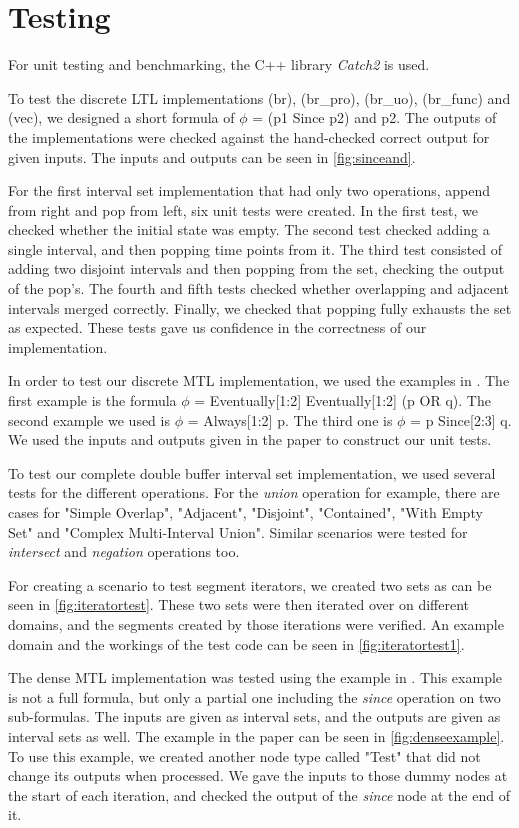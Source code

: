 \documentclass[a4paper,12pt]{report}
\begin{document}
\section{Testing}

For unit testing and benchmarking, the C++ library \textit{Catch2} is used.

To test the discrete LTL implementations (br), (br\_pro), (br\_uo), (br\_func) and (vec), we designed a short formula of $\phi$ = (p1 Since p2) and p2. The outputs of the implementations were checked against the hand-checked correct output for given inputs. The inputs and outputs can be seen in \ref{fig:sinceand}.

For the first interval set implementation that had only two operations, append from right and pop from left, six unit tests were created. In the first test, we checked whether the initial state was empty. The second test checked adding a single interval, and then popping time points from it. The third test consisted of adding two disjoint intervals and then popping from the set, checking the output of the pop's. The fourth and fifth tests checked whether overlapping and adjacent intervals merged correctly. Finally, we checked that popping fully exhausts the set as expected. These tests gave us confidence in the correctness of our implementation.

In order to test our discrete MTL implementation, we used the examples in \cite{Ulus19}. The first example is the formula $\phi$ = Eventually[1:2] Eventually[1:2] (p OR q). The second example we used is $\phi$ = Always[1:2] p. The third one is $\phi$ = p Since[2:3] q. We used the inputs and outputs given in the paper to construct our unit tests.

To test our complete double buffer interval set implementation, we used several tests for the different operations. For the \textit{union} operation for example, there are cases for "Simple Overlap", "Adjacent", "Disjoint", "Contained", "With Empty Set" and "Complex Multi-Interval Union". Similar scenarios were tested for \textit{intersect} and \textit{negation} operations too.

For creating a scenario to test segment iterators, we created two sets as can be seen in \ref{fig:iteratortest}. These two sets were then iterated over on different domains, and the segments created by those iterations were verified. An example domain and the workings of the test code can be seen in \ref{fig:iteratortest1}.

The dense MTL implementation was tested using the example in \cite{Ulus19}. This example is not a full formula, but only a partial one including the \textit{since} operation on two sub-formulas. The inputs are given as interval sets, and the outputs are given as interval sets as well. The example in the paper can be seen in \ref{fig:denseexample}. To use this example, we created another node type called "Test" that did not change its outputs when processed. We gave the inputs to those dummy nodes at the start of each iteration, and checked the output of the \textit{since} node at the end of it.
\end{document}

